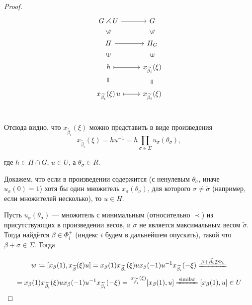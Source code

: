 \documentclass[10pt]{article}
\theoremstyle{remark}
\renewcommand{\le}{\leqslant}
\begin{document}
\begin{proof}
\begin{equation*}
\tikzset{
  Subgroup/.style={
    draw=none,
    every to/.append style={
      edge node={node [sloped, allow upside down, auto=false]{$\le$}}}},
  Equals/.style={
    draw=none,
    every to/.append style={
      edge node={node [sloped, allow upside down, auto=false]{$=$}}}},
  Included/.style={
    draw=none,
    every to/.append style={
      edge node={node [sloped, allow upside down, auto=false]{$\in$}}}}
}
\begin{tikzcd}
G \rightthreetimes U \arrow{r}{} & G \\
H \arrow[Subgroup]{u} \arrow{r}{} & H_G \arrow[Subgroup]{u} \\
h \arrow[Included]{u} \arrow[maps to]{r}{} & x_{\widetilde{\beta_i}}(\xi) \arrow[Included]{u} \\
x_{\widetilde{\beta_i}}(\xi)\,u \arrow[Equals]{u} \arrow[maps to]{r}{} & x_{\widetilde{\beta_i}}(\xi) \arrow[Equals]{u} \\
\end{tikzcd}
\end{equation*}

Отсюда видно, что $x_{\widetilde{\beta_i}}(\xi)$ можно представить в виде произведения $$x_{\widetilde{\beta_i}}(\xi) = h u^{-1} = h \prod_{\sigma \in \Sigma} u_\sigma(\theta_\sigma),$$

где $h\in H\cap G$, $u \in U$, а $\theta_\sigma \in R$.

Докажем, что если в произведении содержится (с ненулевым $\theta_\sigma$, иначе $u_\sigma(0)=1$) хотя бы один множитель $x_\sigma(\theta_\sigma)$, для которого $\sigma \ne \widetilde\sigma$ (например, если множителей несколько), то $u \in H$.%


Пусть $u_\sigma(\theta_\sigma)$ --- множитель с минимальным (относительно $\prec$) из присутствующих в произведении весов, и $\sigma$ не является максимальным весом $\widetilde{\sigma}$. Тогда найдётся $\beta \in \Phi_i^+$ (индекс $i$ будем в дальнейшем опускать), такой что $\beta+\sigma \in \Sigma$. Тогда

$$
w \coloneqq [x_\beta(1), x_{\widetilde{\beta}}(\xi)u] =
x_\beta(1) x_{\widetilde{\beta_i}}(\xi) u x_\beta(-1) u^{-1} x_{\widetilde{\beta_i}}(-\xi)
\xlongequal{\beta+\widetilde{\beta_i}\notin\Phi_i}$$
$$=x_\beta(1) x_{\widetilde{\beta_i}}(\xi) u x_\beta(-1) u^{-1} x_{\widetilde{\beta_i}}(-\xi) = \,
^{x_{\widetilde{\beta_i}}(\xi)}[x_\beta(1),u] \xlongequal{\text{similar}} [x_\beta(1),u] \in U
$$ 


\end{proof}
\end{document}
